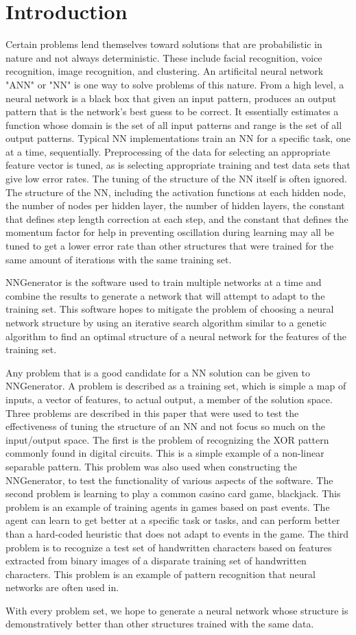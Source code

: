 \chapter[Introduction]{Introduction}
Certain problems lend themselves toward solutions that are probabilistic in nature and not always deterministic.
These include facial recognition, voice recognition, image recognition, and clustering. 
An artificital neural network "ANN" or "NN" is one way to solve problems of this nature. From a high level, a neural network is a black
box that given an input pattern, produces an output pattern that is the network's best guess to be correct. 
It essentially estimates a function whose domain is the set of all input patterns and range is the set of all output patterns. Typical NN implementations train an NN for a specific task, one at a time, sequentially. Preprocessing of the data for selecting an appropriate feature vector is tuned, as is selecting appropriate training and test data sets that give low error rates. The tuning of the structure of the NN itself is often ignored. The structure of the NN, including the activation functions at each hidden node, the number of nodes per hidden layer, the number of hidden layers, the constant that defines step length correction at each step, and the constant that defines the momentum factor for help in preventing oscillation during learning may all be tuned to get a lower error rate than other structures that were trained for the same amount of iterations with the same training set.

NNGenerator is the software used to train multiple networks at a time and combine the results to generate a network that will attempt to adapt to the training set. This software hopes to mitigate the problem of choosing a neural network structure by using an iterative search algorithm similar to a genetic algorithm to find an optimal structure of a neural network for the features of the training set. 

Any problem that is a good candidate for a NN solution can be given to NNGenerator. 
A problem is described as a training set, which is simple a map of inputs, a vector of features, to actual output, a member of the solution space.
Three problems are described in this paper that were used to test the effectiveness of tuning the structure of an NN and not focus so much on the input/output space. The first is the problem of recognizing the XOR pattern commonly found in digital circuits. This is a simple example of a non-linear separable pattern. This problem was also used when constructing the NNGenerator, to test the functionality of various aspects of the software. The second problem is learning to play a common casino card game, blackjack. This problem is an example of training agents in games based on past events. The agent can learn to get better at a specific task or tasks, and can perform better than a hard-coded heuristic that does not adapt to events in the game. The third problem is to recognize a test set of handwritten characters based on features extracted from binary images of a disparate training set of handwritten characters. This problem is an example of pattern recognition that neural networks are often used in.

With every problem set, we hope to generate a neural network whose structure is demonstratively better than other structures trained with the same data.